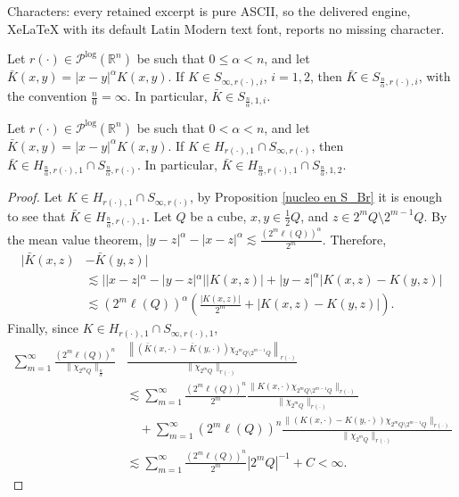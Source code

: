 \documentclass[10pt,a4paper]{amsart}
\newcommand{\R}{{\mathbb{R}^n}}
\begin{document}
Characters: every retained excerpt is pure ASCII, so the delivered engine, XeLaTeX with its default Latin Modern text font, reports no missing character.
\begin{propo}\label{nucleo en S_Br}
	Let $r(\cdot)\in\mathcal{P}^{\text{log}}(\R)$ be such that $0\leq\alpha<n$, and let $\bar{K}(x,y)=|x-y|^\alpha K(x,y)$. If $K\in S_{\infty,r(\cdot),i}$, $i=1,2$, then $\bar{K}\in S_{\frac{n}{\alpha},{r(\cdot)},i}$, with the convention $\frac{n}{0}=\infty$. In particular, $\bar{K}\in S_{\frac{n}{\alpha},1,i}$.
\end{propo}

\begin{propo}\label{construcion kernel}
	Let $r(\cdot)\in\mathcal{P}^{\text{log}}(\R)$ be such that $0<\alpha<n$, and let $\bar{K}(x,y)=|x-y|^\alpha K(x,y)$. If $K\in H_{{r(\cdot)},1}\cap S_{\infty,{r(\cdot)}}$, then $\bar{K}\in H_{\frac{n}{\alpha},{r(\cdot)},1}\cap S_{\frac{n}{\alpha},{r(\cdot)}}$. In particular, $\bar{K}\in H_{\frac{n}{\alpha},{r(\cdot)},1}\cap S_{\frac{n}{\alpha},1,2}$.
\end{propo}

\begin{proof}
	Let $K\in H_{{r(\cdot)},1}\cap S_{\infty,{r(\cdot)}}$, by Proposition \ref{nucleo en S_Br} it is enough to see that $\bar{K}\in H_{\frac{n}{\alpha},{r(\cdot)},1}$. Let $Q$ be a cube, $x,y\in\frac{1}{2}Q$, and $z\in2^mQ\setminus2^{m-1}Q$. By the mean value theorem, $|y-z|^\alpha-|x-z|^\alpha\lesssim \frac{(2^m \ell(Q))^\alpha}{2^m}$. Therefore,
	\begin{align*}
	|\bar{K}(x,z)&-\bar{K}(y,z)|\\
	&\lesssim ||x-z|^\alpha-|y-z|^\alpha||K(x,z)|+|y-z|^\alpha |K(x,z)-K(y,z)|\\
	&\lesssim (2^m \ell(Q))^\alpha\left( \frac{|K(x,z)|}{2^m}+|K(x,z)-K(y,z)|  \right).
	\end{align*}
	Finally, since $K\in H_{r(\cdot),1}\cap S_{\infty,r(\cdot),1}$,
	\begin{align*}
	\sum_{m=1}^{\infty}\frac{\left(2^m \ell(Q)\right)^n}{\|\chi_{2^mQ}\|_{\frac{n}{\alpha}}}&\frac{\left\|(\bar{K}(x,\cdot)-\bar{K}(y,\cdot))\chi_{2^mQ\setminus2^{m-1}Q}\right\|_{r(\cdot)}}{\|\chi_{2^mQ}\|_{r(\cdot)}}\\
	&\lesssim \sum_{m=1}^{\infty}\frac{(2^m\ell(Q))^{n}}{2^m}\frac{\|K(x,\cdot)\chi_{2^mQ\setminus2^{m-1}Q}\|_{r(\cdot)}}{\|\chi_{2^mQ}\|_{r(\cdot)}}\\
	&\quad+\sum_{m=1}^{\infty}\left(2^m\ell(Q)\right)^n\frac{\|(K(x,\cdot)-K(y,\cdot))\chi_{2^mQ\setminus2^{m-1}Q}\|_{r(\cdot)}}{\|\chi_{2^mQ}\|_{r(\cdot)}}\\
	&\lesssim \sum_{m=1}^{\infty}\frac{(2^m\ell(Q))^{n}}{2^m}|2^mQ|^{-1}+C<\infty.
	\end{align*}	
\end{proof}
\end{document}

